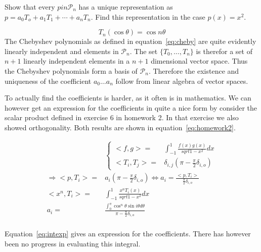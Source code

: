\begin{problem}
  Show that every $p in \mathcal{P}_n$ has a unique representation as
  $p = a_0 T_o + a_1 T_1 + \cdots + a_n T_n$. Find this representation
  in the case $p(x) = x^2$.
\end{problem}

\begin{solution}
  \begin{equation}
    \label{eq:cheby} T_n(\cos{\theta}) = \cos{n\theta}
  \end{equation} The Chebyshev polynomials as defined in
  equation~\ref{eq:cheby} are quite evidently linearly independent and
  elements in $\mathcal{P}_n$. The set $\{ T_0, \dots , T_n\}$ is
  therefor a set of $n+1$ linearly independent elements in a $n+1$
  dimensional vector space. Thus the Chebyshev polynomials form a basis
  of $\mathcal{P}_n$. Therefore the existence and uniqueness of the
  coefficient $a_0 \dots a_n$ follow from linear algebra of vector
  spaces.

  To actually find the coefficients is harder, as it often is in
  mathematics. We can however get an expression for the coefficients in
  quite a nice form by consider the scalar product defined in exercise 6
  in homework 2. In that exercise we also showed orthogonality. Both
  results are shown in equation~\ref{eq:homework2}.

  \begin{align}
    \label{eq:homework2}
    & \begin{cases}
      <f, g> = & \int_{-1}^{1} \frac{f(x) g(x)}{sqrt{1 - x^2}} dx \\
      <T_i, T_j> = & \delta_{i,j} ( \pi - \frac{\pi}{2}\delta_{i,o} )
    \end{cases} \\
    \nonumber
    \Rightarrow <p, T_i> =  & a_i ( \pi - \frac{\pi}{2}\delta_{i,o} ) 
                              \Leftrightarrow a_i =
                              \frac{<p,T_i>}{\frac{\pi}{2}\delta_{i,o}} \\
    \nonumber 
    <x^n, T_i>  = & \int_{-1}^{1} \frac{x^n T_i(x)}{sqrt{1 - x^2}} dx
    \\
    \label{eq:intexp} 
    a_i = & \frac{\int_0^\pi \cos^{n}\theta \sin{i\theta} d\theta}{\pi
            - \frac{\pi}{2}\delta_{i,o}} \\
  \end{align}

Equation~\ref{eq:intexp} gives an expression for the
coefficients. There has however been no progress in evaluating this
integral.

\end{solution}


